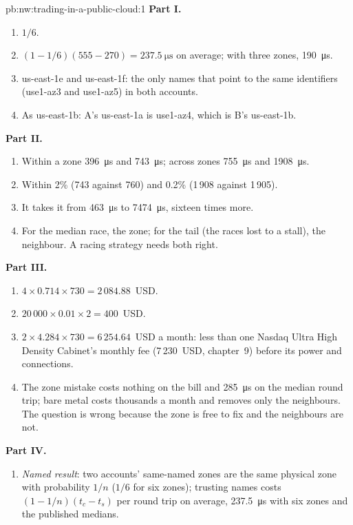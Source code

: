 \begin{solution}{pb:nw:trading-in-a-public-cloud:1}
\textbf{Part I.}
\begin{enumerate}
\item $1/6$.
\item $(1 - 1/6)(555 - 270) = \qty{237.5}{\micro\second}$ on average; with three zones, \qty{190}{\micro\second}.
\item us-east-1e and us-east-1f: the only names that point to the same identifiers (use1-az3 and use1-az5) in both accounts.
\item As us-east-1b: A's us-east-1a is use1-az4, which is B's us-east-1b.
\end{enumerate}
\textbf{Part II.}
\begin{enumerate}[resume]
\item Within a zone \qty{396}{\micro\second} and \qty{743}{\micro\second}; across zones \qty{755}{\micro\second} and \qty{1908}{\micro\second}.
\item Within 2\% (743 against 760) and 0.2\% (1\,908 against 1\,905).
\item It takes it from \qty{463}{\micro\second} to \qty{7474}{\micro\second}, sixteen times more.
\item For the median race, the zone; for the tail (the races lost to a stall), the neighbour. A racing strategy needs both right.
\end{enumerate}
\textbf{Part III.}
\begin{enumerate}[resume]
\item $4 \times 0.714 \times 730 = 2\,084.88$~USD.
\item $20\,000 \times 0.01 \times 2 = 400$~USD.
\item $2 \times 4.284 \times 730 = 6\,254.64$~USD a month: less than one Nasdaq Ultra High Density Cabinet's monthly fee (7\,230~USD, chapter~9) before
  its power and connections.
\item The zone mistake costs nothing on the bill and \qty{285}{\micro\second} on the median round trip; bare metal costs thousands a month and removes
  only the neighbours. The question is wrong because the zone is free to fix and the neighbours are not.
\end{enumerate}
\textbf{Part IV.}
\begin{enumerate}[resume]
\item \emph{Named result}: two accounts' same-named zones are the same physical zone with probability $1/n$ ($1/6$ for six zones); trusting names costs
  $(1 - 1/n)(t_c - t_s)$ per round trip on average, \qty{237.5}{\micro\second} with six zones and the published medians.

\end{enumerate}
\end{solution}

